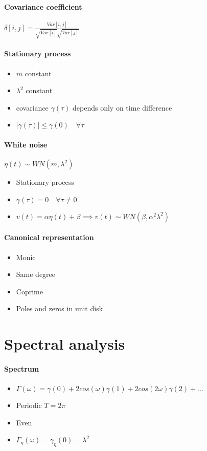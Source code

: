 \documentclass{article}
\begin{document}
\paragraph{Covariance coefficient}
	$\delta[i,j]=\frac{Var[i,j]}{\sqrt{Var[i]}\sqrt{Var[j]}}$
\paragraph{Stationary process}
\begin{itemize}
	\item $m$ constant
	\item $\lambda^2$ constant
	\item covariance $\gamma(\tau)$ depends only on time difference
	\item $|\gamma(\tau)|\leq\gamma(0)		\quad\forall\tau$
\end{itemize}
\paragraph{White noise} $\eta(t)\sim WN(m,\lambda^2)$
\begin{itemize}
	\item Stationary process
	\item $\gamma(\tau)=0	\quad\forall\tau\neq0$
	\item $v(t)=\alpha \eta (t)+\beta\implies v(t)\sim WN(\beta,\alpha^2 \lambda^2)$
\end{itemize}
\paragraph{Canonical representation}
\begin{itemize}
\item Monic
\item Same degree
\item Coprime
\item Poles and zeros in unit disk
\end{itemize}
\section{Spectral analysis}
\paragraph{Spectrum}
\begin{itemize}
\item $\Gamma(\omega)=\gamma(0)+2cos(\omega)\gamma(1)+2cos(2\omega)\gamma(2)+...$
\item Periodic $T=2\pi$
\item Even
\item $\Gamma_\eta(\omega)=\gamma_\eta(0)=\lambda^2$
\end{itemize}
\end{document}

